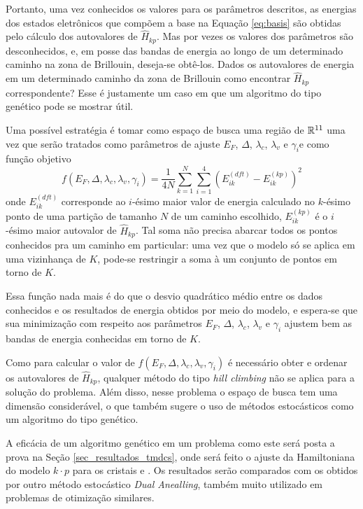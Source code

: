 Portanto, uma vez conhecidos os valores para os parâmetros descritos, as
energias dos estados eletrônicos que compõem a base na Equação \ref{eq:basis}
são obtidas pelo cálculo dos autovalores de $\hat{H}_{kp}$. Mas por vezes
os valores dos parâmetros são desconhecidos, e, em posse das bandas de energia ao
longo de um determinado caminho na zona de Brillouin, deseja-se obtê-los.
Dados os autovalores de energia em um determinado caminho da zona de Brillouin
como encontrar $\hat{H}_{kp}$ correspondente? Esse é justamente um caso em que
um algoritmo do tipo genético pode se mostrar útil.

Uma possível estratégia é tomar como espaço de busca uma região de $\mathbb{R}^{11}$
\trav uma vez que serão tratados como parâmetros de ajuste $E_F$, $\Delta$, 
$\lambda_c$, $\lambda_v$ e $\gamma_i$\trav e como função objetivo
\begin{equation}
  f(E_F, \Delta, \lambda_c, \lambda_v, \gamma_i) = 
  \frac{1}{4 N} \sum_{k=1}^N \sum_{i=1}^4 \left( E_{ik}^{(dft)} - E_{ik}^{(kp)} \right)^2
  \label{eq:tmdc_obj_function}
\end{equation}
onde $E_{ik}^{(dft)}$ corresponde ao $i$-ésimo maior valor de energia calculado no
$k$-ésimo ponto de uma partição de tamanho $N$ de um caminho escolhido,
$E_{ik}^{(kp)}$ é o $i$-ésimo maior autovalor de $\hat{H}_{kp}$. Tal soma não
precisa abarcar todos os pontos conhecidos pra um caminho em particular: uma vez
que o modelo só se aplica em uma vizinhança de $K$, pode-se restringir a soma à
um conjunto de pontos em torno de $K$.

Essa função nada mais é do que o desvio quadrático médio entre os dados
conhecidos e os resultados de energia obtidos por meio do modelo, e espera-se
que sua minimização com respeito aos parâmetros $E_F$, $\Delta$, $\lambda_c$,
$\lambda_v$ e $\gamma_i$ ajustem bem as bandas de energia conhecidas em torno de
$K$.

Como para calcular o valor de $ f(E_F, \Delta, \lambda_c, \lambda_v, \gamma_i) $
é necessário obter e ordenar os autovalores de $\hat{H}_{kp}$, qualquer método
do tipo \textit{hill climbing} não se aplica para a solução do problema. Além disso, nesse
problema o espaço de busca tem uma dimensão considerável, o que também sugere o
uso de métodos estocásticos como um algoritmo do tipo genético.

A eficácia de um algoritmo genético em um problema como este será posta a prova
na Seção \ref{sec_resultados_tmdcs}, onde será feito o ajuste da Hamiltoniana do
modelo $ k \cdot p $ para os cristais  e . Os resultados
serão comparados com os obtidos por outro método estocástico \textit{Dual Anealling},
também muito utilizado em problemas de otimização similares.

